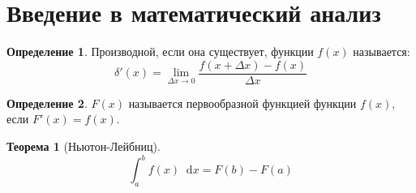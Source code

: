 \documentclass[12pt]{article}
\theoremstyle{definition}
\newtheorem{theorem}{Теорема}[section]
\newtheorem{definition}{Определение}
\newcommand*\diff{\mathop{}\!\mathrm{d}}
\begin{document}
\section{Введение в математический анализ}

\begin{definition}
    Производной, если она существует, функции $f(x)$ называется:
    $$\delta'(x)=\lim_{\Delta x\to0}\frac{f(x+\Delta x)-f(x)}{\Delta x}$$
\end{definition}
\begin{definition}
    $F(x)$ называется первообразной функцией функции $f(x)$, если $F'(x)=f(x)$.
\end{definition}
\begin{theorem}[Ньютон-Лейбниц]
    $$\int_{a}^{b}f(x)\diff x=F(b)-F(a)$$
\end{theorem}
\end{document}
